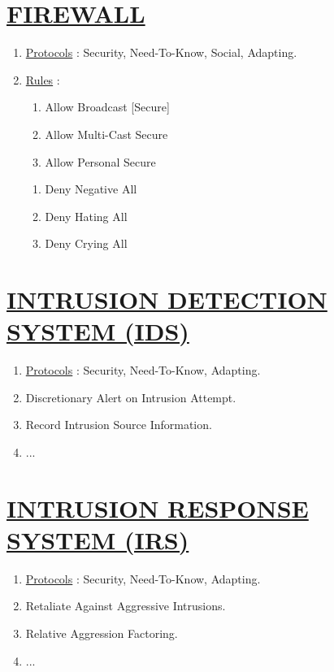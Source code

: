 \documentclass[11pt]{article}
\begin{document}
\section*{\ul{FIREWALL}}
\begin{enumerate}
	\item[] \ul{Protocols} : Security, Need-To-Know, Social, Adapting.

	\item[] \ul{Rules} :
	\begin{enumerate}
		\item[] Allow Broadcast [Secure]
		\item[] Allow Multi-Cast Secure
		\item[] Allow Personal Secure
	\end{enumerate}

	\begin{enumerate}
		\item[] Deny Negative All
		\item[] Deny Hating All
		\item[] Deny Crying All
	\end{enumerate}
	
\end{enumerate}


\section*{\ul{INTRUSION DETECTION SYSTEM (IDS)}}
\begin{enumerate}
	\item[] \ul{Protocols} : Security, Need-To-Know, Adapting.
	
	\item[] Discretionary Alert on Intrusion Attempt.
	\item[] Record Intrusion Source Information.
	\item[] ...
	
\end{enumerate}


\section*{\ul{INTRUSION RESPONSE SYSTEM (IRS)}}
\begin{enumerate}
	\item[] \ul{Protocols} : Security, Need-To-Know, Adapting.
	
	\item[] Retaliate Against Aggressive Intrusions.
	\item[] Relative Aggression Factoring.
	\item[] ...
	
\end{enumerate}
\end{document}
